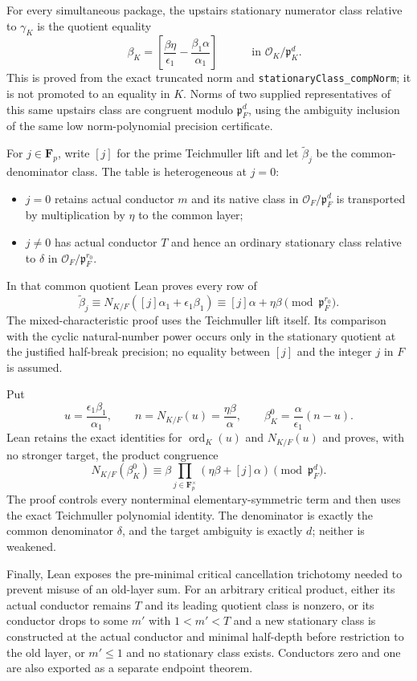 \begin{theorem}
For every simultaneous package, the upstairs stationary numerator class
relative to $\gamma_K$ is the quotient equality
\[
 \boxed{\quad
 \beta_K=
 \left[
   \frac{\beta\eta}{\epsilon_1}
   -\frac{\beta_1\alpha}{\alpha_1}
 \right]
 \quad}
 \qquad\text{in }\mathcal O_K/\mathfrak p_K^d.
\]
This is proved from the exact truncated norm and
\texttt{stationaryClass\_compNorm}; it is not promoted to an equality in
$K$.  Norms of two supplied representatives of this same upstairs class
are congruent modulo $\mathfrak p_F^d$, using the ambiguity inclusion of
the same low norm-polynomial precision certificate.

For $j\in\mathbf F_p$, write $[j]$ for the prime Teichmuller lift and let
$\widetilde\beta_j$ be the common-denominator class.  The table is
heterogeneous at $j=0$:
\begin{itemize}
\item $j=0$ retains actual conductor $m$ and its native class in
  $\mathcal O_F/\mathfrak p_F^d$ is transported by multiplication by
  $\eta$ to the common layer;
\item $j\ne0$ has actual conductor $T$ and hence an ordinary stationary
  class relative to $\delta$ in
  $\mathcal O_F/\mathfrak p_F^{r_0}$.
\end{itemize}
In that common quotient Lean proves every row of
\[
 \boxed{\quad
 \widetilde\beta_j
 \equiv N_{K/F}([j]\alpha_1+\epsilon_1\beta_1)
 \equiv [j]\alpha+\eta\beta
 \pmod{\mathfrak p_F^{r_0}}.
 \quad}
\]
The mixed-characteristic proof uses the Teichmuller lift itself.  Its
comparison with the cyclic natural-number power occurs only in the
stationary quotient at the justified half-break precision; no equality
between $[j]$ and the integer $j$ in $F$ is assumed.

Put
\[
 u=\frac{\epsilon_1\beta_1}{\alpha_1},
 \qquad
 n=N_{K/F}(u)=\frac{\eta\beta}{\alpha},
 \qquad
 \beta_K^0=\frac{\alpha}{\epsilon_1}(n-u).
\]
Lean retains the exact identities for $\operatorname{ord}_K(u)$ and
$N_{K/F}(u)$ and proves, with no stronger target, the product congruence
\[
 \boxed{\quad
 N_{K/F}(\beta_K^0)
 \equiv
 \beta\prod_{j\in\mathbf F_p^\times}
   (\eta\beta+[j]\alpha)
 \pmod{\mathfrak p_F^d}.
 \quad}
\]
The proof controls every nonterminal elementary-symmetric term and then
uses the exact Teichmuller polynomial identity.  The denominator is
exactly the common denominator $\delta$, and the target ambiguity is
exactly $d$; neither is weakened.

Finally, Lean exposes the pre-minimal critical cancellation trichotomy
needed to prevent misuse of an old-layer sum.  For an arbitrary critical
product, either its actual conductor remains $T$ and its leading quotient
class is nonzero, or its conductor drops to some $m'$ with
$1<m'<T$ and a new stationary class is constructed at the actual
conductor and minimal half-depth before restriction to the old layer, or
$m'\leq1$ and no stationary class exists.  Conductors zero and one are
also exported as a separate endpoint theorem.


\end{theorem}
